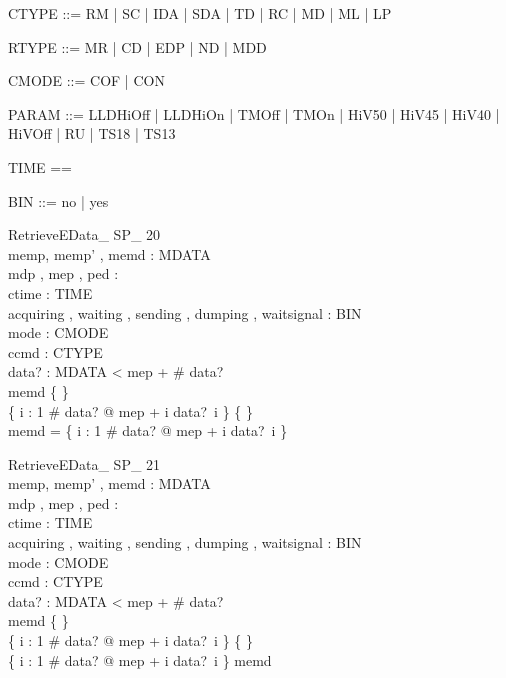 \begin{zed}
[MDATA]
\end{zed}

\begin{zed}
CTYPE ::= RM | SC | IDA | SDA | TD | RC | MD | ML | LP
\end{zed}

\begin{zed}
RTYPE ::= MR | CD | EDP | ND | MDD
\end{zed}

\begin{zed}
CMODE ::= COF | CON
\end{zed}

\begin{zed}
PARAM ::= 
  LLDHiOff 
  | LLDHiOn | TMOff | TMOn | HiV50 | HiV45 | HiV40 | HiVOff | RU | TS18 | TS13
\end{zed}

\begin{zed}
TIME == \nat
\end{zed}

\begin{zed}
BIN ::= no | yes
\end{zed}

\begin{schema}{RetrieveEData\_ SP\_ 20}\\
 memp, memp' , memd : \seq MDATA \\
 mdp , mep , ped : \nat \\
 ctime : TIME \\
 acquiring , waiting , sending , dumping , waitsignal : BIN \\
 mode : CMODE \\
 ccmd : CTYPE \\
 data? : \seq MDATA 
 < mep + \# data? \\
 memd \neq \{ \} \\
 \{ i : 1 \upto \# data? @ mep + i \mapsto data?~i \} \neq \{ \} \\
 \dom memd = \dom \{ i : 1 \upto \# data? @ mep + i \mapsto data?~i \}
\end{schema}


\begin{schema}{RetrieveEData\_ SP\_ 21}\\
 memp, memp' , memd : \seq MDATA \\
 mdp , mep , ped : \nat \\
 ctime : TIME \\
 acquiring , waiting , sending , dumping , waitsignal : BIN \\
 mode : CMODE \\
 ccmd : CTYPE \\
 data? : \seq MDATA 
 < mep + \# data? \\
 memd \neq \{ \} \\
 \{ i : 1 \upto \# data? @ mep + i \mapsto data?~i \} \neq \{ \} \\
 \dom \{ i : 1 \upto \# data? @ mep + i \mapsto data?~i \} \subset \dom memd
\end{schema}



